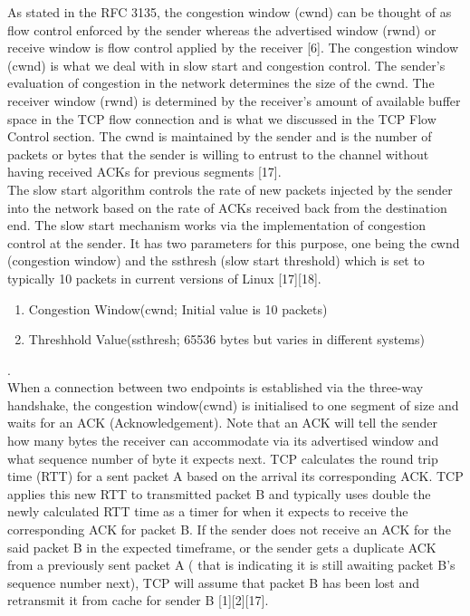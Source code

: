 \documentclass{uathesis}
\begin{document}
As stated in the RFC 3135, the congestion window (cwnd) can be thought of as flow control enforced by the sender whereas the advertised window (rwnd) or receive window is flow control applied by the receiver [6]. The congestion window (cwnd) is what we deal with in slow start and congestion control. The sender's evaluation of congestion in the network determines the size of the cwnd. The receiver window (rwnd) is determined by the receiver's amount of available buffer space in the TCP flow connection and is what we discussed in the TCP Flow Control section. The cwnd is maintained by the sender and is the number of packets or bytes that the sender is willing to entrust to the channel without having received ACKs for previous segments [17]. \\

The slow start algorithm controls the rate of new packets injected by the sender into the network based on the rate of ACKs received back from the destination end. The slow start mechanism works via the implementation of congestion control at the sender. It has two parameters for this purpose, one being the cwnd (congestion window) and the ssthresh (slow start threshold) which is set to typically 10 packets in current versions of Linux [17][18]. \\

\begin{enumerate}
\item Congestion Window(cwnd; Initial value is 10 packets)
\item Threshhold Value(ssthresh; 65536 bytes but varies in different systems)
\end{enumerate}.
\\

When a connection between two endpoints is established via the three-way handshake, the congestion window(cwnd) is initialised to one segment of size and waits for an ACK (Acknowledgement). Note that an ACK will tell the sender how many bytes the receiver can accommodate via its advertised window and what sequence number of byte it expects next. TCP calculates the round trip time (RTT) for a sent packet A based on the arrival its corresponding ACK. TCP applies this new RTT to transmitted packet B and typically uses double the newly calculated RTT time as a timer for when it expects to receive the corresponding ACK for packet B. If the sender does not receive an ACK for the said packet B in the expected timeframe, or the sender gets a duplicate ACK from a previously sent packet A ( that is indicating it is still awaiting packet B's sequence number next), TCP will assume that packet B has been lost and retransmit it from cache for sender B [1][2][17]. \\
\end{document}
